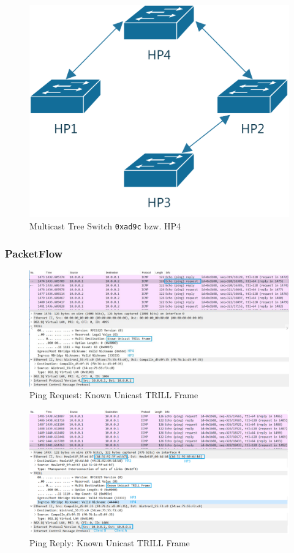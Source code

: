 \begin{figure}[H]
	\centering
	\includegraphics[width=0.5\linewidth]{images/multicast_trees/0xad9c}
	\caption{Multicast Tree Switch \lstinline|0xad9c| bzw. HP4}
	\label{fig:multicasttree0xad9c}
\end{figure}



\subsubsection{PacketFlow}


\begin{figure}
	\centering
	\includegraphics[width=\linewidth]{images/ping_request}
	\caption{Ping Request: Known Unicast TRILL Frame}
	\label{fig:trillpackage}
\end{figure}


\begin{figure}
	\centering
	\includegraphics[width=\linewidth]{images/ping_reply}
	\caption{Ping Reply: Known Unicast TRILL Frame}
	\label{fig:trillpackage}
\end{figure}

